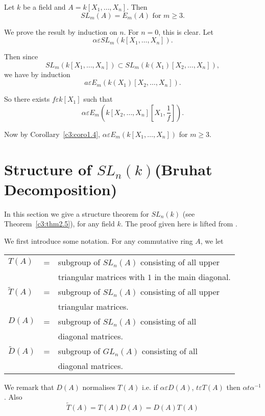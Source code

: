 \begin{coro}\label{c3:coro1.5}
Let $k$ be a field and $A=k[X_1,\ldots,X_n]$. Then
$$
SL_m(A)=E_m(A)\text{ for } m\geq 3.
$$
\end{coro}

\begin{Proof}
We prove the result by induction on $n$. For $n=0$, this is clear. Let 
$$
\alpha\varepsilon SL_m(k[X_1,\ldots,X_n]).
$$

Then since
$$
SL_m(k[X_1,\ldots,X_n])\subset SL_m(k(X_1)[X_2,\ldots,X_n]),
$$
we have by induction
$$
a\varepsilon E_m(k(X_1)[X_2,\ldots,X_n]).
$$

So there exists $f\varepsilon k[X_1]$ such that 
$$
\alpha\varepsilon E_m\left(k[X_2,\ldots,X_n]\left[X_1,\frac{1}{f}\right]\right).
$$

Now by Corollary~\ref{c3:coro1.4}, $\alpha \varepsilon
E_m(k[X_1,\ldots,X_n])$ for $m\geq 3$. 
\enprf
\end{Proof}


\section{Structure of \texorpdfstring{$SL_n(k)$}{SLnk}(Bruhat Decomposition)}\label{c3:s2}

In this section we give a structure theorem for $SL_n(k)$ (see
Theorem~\ref{c3:thm2.5}), for any field $k$. The proof given here is
lifted from \cite{Milnor}.

We first introduce some notation. For any commutative ring $A$, we let

\begin{tabular}{lll}
$T(A)$&=&subgroup of $SL_n(A)$ consisting of all upper \\
&& triangular matrices with $1$ in the main diagonal.\\
$\tilde{T}(A)$&=&subgroup of $SL_n(A)$ consisting of all upper\\
& &triangular matrices.\\
$D(A)$&=& subgroup of $SL_n(A)$ consisting of all\\
& &diagonal matrices.\\
$\tilde{D}(A)$&=&subgroup of $GL_n(A)$ consisting of all \\
&&diagonal matrices.\\
\end{tabular}

We remark that $D(A)$ normalises $T(A)$ i.e. if $\alpha\varepsilon
D(A)$, $t\varepsilon T(A)$ then $\alpha t\alpha^{-1}$. Also
$$
\tilde{T}(A)=T(A)D(A)=D(A)T(A)
$$

